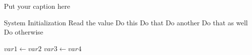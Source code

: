 \begin{algorithm}[H]
\caption{Put your caption here}
\begin{algorithmic}[1]

       
    \State System Initialization
    \State Read the value 
        \State Do this
        \State Do that
        \State Do another
        \State Do that as well
        \Else
        \State Do otherwise
        \EndIf
    \EndIf

      
        \State $var1 \leftarrow var2$  
        \State $var3 \leftarrow var4$
    \EndWhile  \label{roy's loop}
\EndProcedure
\end{algorithmic}
\end{algorithm}


